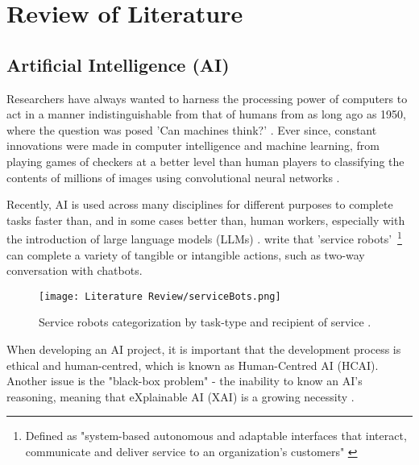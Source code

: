 




\section{Review of Literature}

\subsection{Artificial Intelligence (AI)}\label{sec:LitReviewAI}

Researchers have always wanted to harness the processing power of computers to act in a manner 
indistinguishable from that of humans from as long ago as 1950, where the question was posed 
'Can machines think?' \autocite{turing_icomputing_1950}. Ever since, constant innovations were made in computer 
intelligence and machine learning, from playing games of checkers at a better level than human players \autocite{samuel_studies_1959}
to classifying the contents of millions of images using convolutional neural networks \autocite{krizhevsky_imagenet_2012}.

Recently, AI is used across many disciplines for different purposes to complete tasks faster than, and in some cases better than,
human workers, especially with the introduction of large language models (LLMs) \autocite{AIDigitalAssistants}. \textcite{wirtz_brave_2018} write that 'service robots'~\footnote{Defined as "system-based autonomous and adaptable interfaces that 
interact, communicate and deliver service to an organization’s customers" \autocite[p.909]{wirtz_brave_2018}} can complete a variety of 
tangible or intangible actions, such as two-way conversation with chatbots.

\begin{figure}[H]
    \centering
    \texttt{[image: Literature Review/serviceBots.png]}
    \caption{Service robots categorization by task-type and recipient of service \autocite{wirtz_brave_2018}.}
    \label{fig:serviceBots}
\end{figure}

When developing an AI project, it is important that the development process
is ethical and human-centred, which is known as Human-Centred AI (HCAI). 
Another issue is the "black-box problem" - the inability to know an AI's reasoning, meaning that 
eXplainable AI (XAI) is a growing necessity \autocite{miro-nicolau_comprehensive_2025}. 

